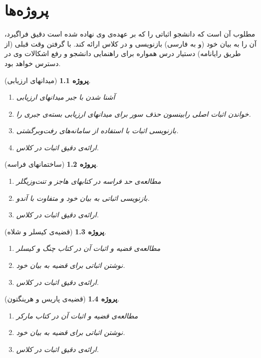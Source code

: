 \documentclass[12pt,a4paper]{report}
\theoremstyle{colorhead}
\newtheorem{por}{پروژه‌}
\begin{document}
\chapter{پروژه‌ها}
مطلوب آن است که دانشجو اثباتی را که بر عهده‌ی وی نهاده شده است دقیق فراگیرد، آن را به بیان خود (و به فارسی) بازنویسی و در کلاس ارائه  کند. 
با گرفتن وقت قبلی (از طریق رایانامه) دستیار درس همواره برای راهنمایی دانشجو و رفع اشکالات وی
در دسترس خواهد بود. 
\begin{por}[میدانهای ارزیابی]
\hfill 
\begin{enumerate}
\item 
آشنا شدن با جبر میدانهای ارزیابی
\item 
خواندن اثبات اصلی رابینسون حذف سور برای میدانهای ارزیابی بسته‌ی جبری را.
\item 
بازنویسی اثبات با استفاده از سامانه‌های رفت‌وبرگشتی.
\item
ارائه‌ی دقیق اثبات در کلاس.
\end{enumerate}
\end{por}
\begin{por}[ساختمانهای فراسه]
\hfill 
\begin{enumerate}
\item 
مطالعه‌ی حد فراسه در کتابهای هاجز و تنت‌وزیگلر
\item 
بازنویسی اثباتی به بیان خود و متفاوت با آندو.
\item
ارائه‌ی دقیق اثبات در کلاس.
\end{enumerate}
\end{por}
\begin{por}[قضیه‌ی  کیسلر و شلاه]
\hfill 
\begin{enumerate}
\item 
مطالعه‌ی قضیه و اثبات آن در کتاب چنگ و کیسلر
\item 
نوشتن اثباتی برای قضیه به بیان خود.
\item
ارائه‌ی دقیق اثبات در کلاس.
\end{enumerate}
\end{por}
\begin{por}[قضیه‌ی پاریس و هرینگتون]
\hfill 
\begin{enumerate}
\item 
مطالعه‌ی قضیه و اثبات آن در کتاب مارکر
\item 
نوشتن اثباتی برای قضیه به بیان خود.
\item
ارائه‌ی دقیق اثبات در کلاس.
\end{enumerate}

\end{por}
\end{document}
